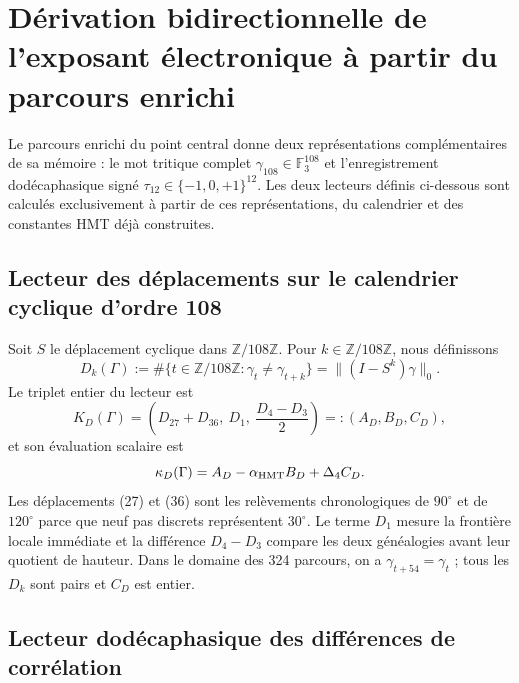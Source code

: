 \section{Dérivation bidirectionnelle de l'exposant électronique à partir du parcours enrichi}
\label{sec:cierre-electron-two-way-rev11}

Le parcours enrichi du point central donne deux représentations
complémentaires de sa mémoire : le mot tritique complet
\(\gamma_{108}\in\mathbb F_3^{108}\) et l'enregistrement dodécaphasique signé
\(\tau_{12}\in\{-1,0,+1\}^{12}\). Les deux lecteurs définis ci-dessous
sont calculés exclusivement à partir de ces représentations, du calendrier et des
constantes HMT déjà construites.

\subsection{Lecteur des déplacements sur le calendrier cyclique d'ordre 108}

Soit \(S\) le déplacement cyclique dans \(\mathbb Z/108\mathbb Z\). Pour
\(k\in\mathbb Z/108\mathbb Z\), nous définissons
\begin{equation}
 D_k(\Gamma):=
 \#\{t\in\mathbb Z/108\mathbb Z:\gamma_t\ne\gamma_{t+k}\}
 =\lVert(I-S^k)\gamma\rVert_0.
 \label{eq:lector-dk-ct108-rev11}
\end{equation}
Le triplet entier du lecteur est
\begin{equation}
 K_D(\Gamma)=
 \left(D_{27}+D_{36},\ D_1,\ \frac{D_4-D_3}{2}\right)
 =:(A_D,B_D,C_D),
 \label{eq:KD-rev11}
\end{equation}
et son évaluation scalaire est
\begin{equation}
 \kappa_D(\Gamma)=A_D-\alpha_{\rm HMT}B_D+\Delta_4 C_D.
 \label{eq:kappaD-rev11}
\end{equation}
Les déplacements (27) et (36) sont les relèvements chronologiques de
\(90^\circ\) et de \(120^\circ\) parce que neuf pas discrets représentent
\(30^\circ\). Le terme \(D_1\) mesure la frontière locale immédiate et la
différence \(D_4-D_3\) compare les deux généalogies avant leur quotient de
hauteur. Dans le domaine des 324 parcours, on a
\(\gamma_{t+54}=\gamma_t\) ; tous les \(D_k\) sont pairs et \(C_D\) est entier.

\subsection{Lecteur dodécaphasique des différences de corrélation}

